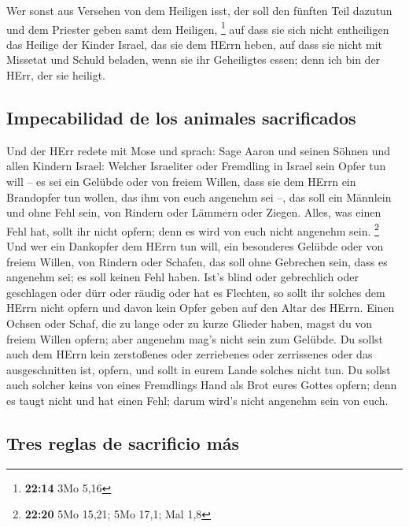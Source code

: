  Wer sonst aus Versehen von dem Heiligen isst, der soll
den fünften Teil dazutun und dem Priester geben samt dem Heiligen,
\footnote{\textbf{22:14} 3Mo 5,16}  auf dass sie sich
nicht entheiligen das Heilige der Kinder Israel, das sie dem HErrn
heben,  auf dass sie nicht mit Missetat und Schuld
beladen, wenn sie ihr Geheiligtes essen; denn ich bin der HErr, der sie
heiligt.

\hypertarget{impecabilidad-de-los-animales-sacrificados}{%
\subsection{Impecabilidad de los animales
sacrificados}\label{impecabilidad-de-los-animales-sacrificados}}

 Und der HErr redete mit Mose und sprach: 
Sage Aaron und seinen Söhnen und allen Kindern Israel: Welcher
Israeliter oder Fremdling in Israel sein Opfer tun will -- es sei ein
Gelübde oder von freiem Willen, dass sie dem HErrn ein Brandopfer tun
wollen, das ihm von euch angenehm sei --,  das soll ein
Männlein und ohne Fehl sein, von Rindern oder Lämmern oder Ziegen.
 Alles, was einen Fehl hat, sollt ihr nicht opfern; denn
es wird von euch nicht angenehm sein. \footnote{\textbf{22:20} 5Mo
  15,21; 5Mo 17,1; Mal 1,8}  Und wer ein Dankopfer dem
HErrn tun will, ein besonderes Gelübde oder von freiem Willen, von
Rindern oder Schafen, das soll ohne Gebrechen sein, dass es angenehm
sei; es soll keinen Fehl haben.  Ist's blind oder
gebrechlich oder geschlagen oder dürr oder räudig oder hat es Flechten,
so sollt ihr solches dem HErrn nicht opfern und davon kein Opfer geben
auf den Altar des HErrn.  Einen Ochsen oder Schaf, die zu
lange oder zu kurze Glieder haben, magst du von freiem Willen opfern;
aber angenehm mag's nicht sein zum Gelübde.  Du sollst
auch dem HErrn kein zerstoßenes oder zerriebenes oder zerrissenes oder
das ausgeschnitten ist, opfern, und sollt in eurem Lande solches nicht
tun.  Du sollst auch solcher keins von eines Fremdlings
Hand als Brot eures Gottes opfern; denn es taugt nicht und hat einen
Fehl; darum wird's nicht angenehm sein von euch.

\hypertarget{tres-reglas-de-sacrificio-muxe1s}{%
\subsection{Tres reglas de sacrificio
más}\label{tres-reglas-de-sacrificio-muxe1s}}

